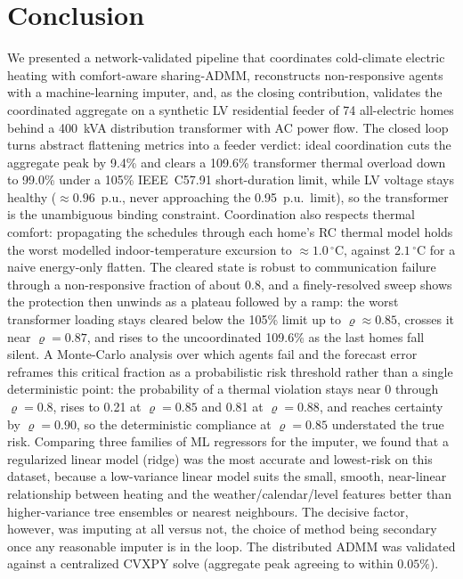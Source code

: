 \section{Conclusion}

We presented a network-validated pipeline that coordinates cold-climate electric
heating with comfort-aware sharing-ADMM, reconstructs non-responsive agents with a
machine-learning imputer, and, as the closing contribution, validates the
coordinated aggregate on a synthetic LV residential feeder of 74 all-electric
homes behind a 400~kVA distribution transformer with AC power flow. The closed
loop turns abstract flattening metrics into a feeder verdict: ideal coordination
cuts the aggregate peak by 9.4\% and clears a 109.6\% transformer thermal overload
down to 99.0\% under a 105\% IEEE~C57.91 short-duration limit, while LV voltage
stays healthy ($\approx 0.96$~p.u., never approaching the 0.95~p.u.\ limit), so the
transformer is the unambiguous binding constraint. Coordination also respects
thermal comfort: propagating the schedules through each home's RC thermal model
holds the worst modelled indoor-temperature excursion to
$\approx 1.0\,^{\circ}\mathrm{C}$, against $2.1\,^{\circ}\mathrm{C}$ for a naive
energy-only flatten. The cleared state is robust to communication failure through a
non-responsive fraction of about 0.8, and a finely-resolved sweep shows the
protection then unwinds as a plateau followed by a ramp: the worst transformer
loading stays cleared below the 105\% limit up to $\varrho \approx 0.85$, crosses
it near $\varrho = 0.87$, and rises to the uncoordinated 109.6\% as the last homes
fall silent. A Monte-Carlo analysis over which agents fail and the forecast error
reframes this critical fraction as a probabilistic risk threshold rather than a
single deterministic point: the probability of a thermal violation stays near 0
through $\varrho = 0.8$, rises to 0.21 at $\varrho = 0.85$ and 0.81 at
$\varrho = 0.88$, and reaches certainty by $\varrho = 0.90$, so the deterministic
compliance at $\varrho = 0.85$ understated the true risk. Comparing three families
of ML regressors for the imputer, we found that a regularized linear model (ridge)
was the most accurate and lowest-risk on this dataset, because a low-variance linear
model suits the small, smooth, near-linear relationship between heating and the
weather/calendar/level features better than higher-variance tree ensembles or
nearest neighbours. The decisive factor, however, was imputing at all versus not, the
choice of method being secondary once any reasonable imputer is in the loop. The
distributed ADMM was validated against a centralized CVXPY solve (aggregate peak
agreeing to within $0.05\%$).

